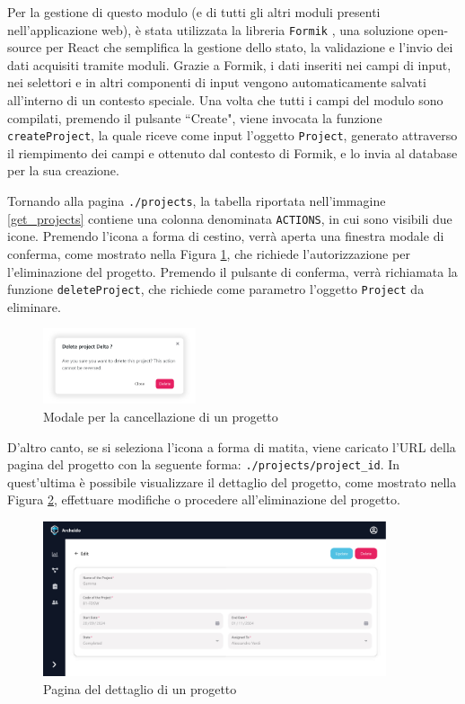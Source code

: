\documentclass[target=bach,aauheader=,style=]{thud}
\begin{document}
\noindent Per la gestione di questo modulo (e di tutti gli altri moduli presenti nell'applicazione web), è stata utilizzata la libreria \texttt{Formik} \cite{formik}, una soluzione open-source per React che semplifica la gestione dello stato, la validazione e l'invio dei dati acquisiti tramite moduli. Grazie a Formik, i dati inseriti nei campi di input, nei selettori e in altri componenti di input vengono automaticamente salvati all'interno di un contesto speciale. Una volta che tutti i campi del modulo sono compilati, premendo il pulsante ``Create", viene invocata la funzione \texttt{createProject}, la quale riceve come input l'oggetto \texttt{Project}, generato attraverso il riempimento dei campi e ottenuto dal contesto di Formik, e lo invia al database per la sua creazione.

\noindent Tornando alla pagina \texttt{./projects}, la tabella riportata nell'immagine \ref{get_projects} contiene una colonna denominata \texttt{ACTIONS}, in cui sono visibili due icone. Premendo l'icona a forma di cestino, verrà aperta una finestra modale di conferma, come mostrato nella Figura \ref{delete_modal}, che richiede l'autorizzazione per l'eliminazione del progetto. Premendo il pulsante di conferma, verrà richiamata la funzione \texttt{deleteProject}, che richiede come parametro l'oggetto \texttt{Project} da eliminare.

\begin{figure}[H]
    \centering
    \includegraphics[width=0.4\textwidth]{img/interfacce/modal.pdf} 
    \caption{Modale per la cancellazione di un progetto}
    \label{delete_modal}
\end{figure}

\noindent D'altro canto, se si seleziona l'icona a forma di matita, viene caricato l'URL della pagina del progetto con la seguente forma: \texttt{./projects/project\_id}. In quest'ultima è possibile visualizzare il dettaglio del progetto, come mostrato nella Figura \ref{detail_project}, effettuare modifiche o procedere all'eliminazione del progetto.

\begin{figure}[H]
    \centering
    \includegraphics[width=0.9\textwidth]{img/interfacce/table_edit.pdf} 
    \caption{Pagina del dettaglio di un progetto}
    \label{detail_project}
\end{figure}
\end{document}
